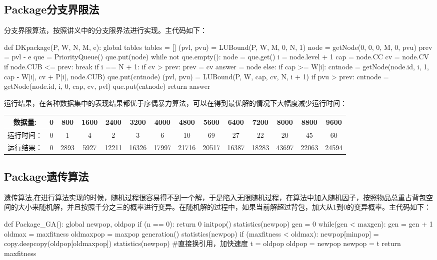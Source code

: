 \documentclass[paper=a4,margin=0.5cm]{scrartcl} %
\begin{document}
\subsection{Package分支界限法}

\indent 分支界限算法，按照讲义中的分支限界法进行实现。主代码如下：\\
\begin{python}
def DKpackage(P, W, N, M, e):
	global tables
	tables = []
	(pvl, pvu) = LUBound(P, W, M, 0, N, 1)
	node = getNode(0, 0, 0, M, 0, pvu)
	prev = pvl - e
	que = PriorityQueue()
	que.put(node)
	while not que.empty():
		node = que.get()
		i = node.level + 1
		cap = node.CC
		cv = node.CV
		if node.CUB <= prev:
			break
		if i == N + 1:
			if cv > prev:
				prev = cv
				answer = node
		else:
			if cap >= W[i]:
				cntnode = getNode(node.id, i, 1, cap - W[i], cv + P[i], node.CUB)
				que.put(cntnode)
			(pvl, pvu) = LUBound(P, W, cap, cv, N, i + 1)   
			if pvu > prev:
				cntnode = getNode(node.id, i, 0, cap, cv, pvl)  
				que.put(cntnode)
	return answer
\end{python}

\indent 运行结果，在各种数据集中的表现结果都优于序偶暴力算法，可以在得到最优解的情况下大幅度减少运行时间：\\
\begin{tabular}{cccccccccccccc}
	\hline 
	数据量:& 0 & 800 & 1600 & 2400 & 3200 & 4000 & 4800 & 5600 & 6400 & 7200 & 8000 & 8800 & 9600\\ 
	\hline 
	运行时间：& 0 & 1 & 4 & 2 & 3 & 6 & 10 & 69 & 27 & 22 & 20 & 45 & 60 \\ 
	\hline 
	运行结果：& 0 & 2893 & 5927 & 12211 & 16326 & 17997 & 21716 & 20517 & 16387 & 18283 & 43697 & 22063 & 24594\\ 
	\hline 
\end{tabular}


\subsection{Package遗传算法}
\indent 遗传算法,在进行算法实现的时候，随机过程很容易得不到一个解，于是陷入无限随机过程，在算法中加入随机因子，按照物品总重占背包空间的大小来随机解，并且按照千分之三的概率进行变异。在随机解的过程中，如果当前解超过背包，加大从1到0的变异概率。主代码如下：\\
\begin{python}
def Package_GA():
	global newpop, oldpop
	if (n == 0):
		return 0
	initpop()
	statistics(newpop)
	gen = 0 
	while(gen < maxgen):
		gen = gen + 1
		oldmax = maxfitness
		oldmaxpop = maxpop
		generation()
		statistics(newpop)
		if (maxfitness < oldmax):
			newpop[minpop] = copy.deepcopy(oldpop[oldmaxpop])
			statistics(newpop)
		#直接换引用，加快速度
		t = oldpop
		oldpop = newpop
		newpop = t
return maxfitness
\end{python}
\end{document}
